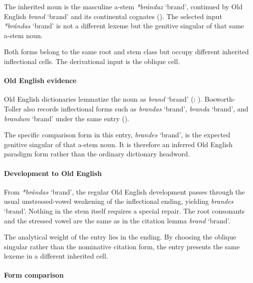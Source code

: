 \documentclass[
  british,
  a4paper,
]{article}
\providecommand{\Recon}[1]{\emph{*#1}}
\begin{document}
The inherited noun is the masculine a-stem \Recon{brándaz} `brand',
continued by Old English {\emph{brand}} `brand' and its continental
cognates (). The selected input
\Recon{brándas} `brand' is not a different lexeme but the genitive
singular of that same a-stem noun.

Both forms belong to the same root and stem class but occupy different
inherited inflectional cells. The derivational input is the oblique
cell.

\paragraph{Old English evidence}\label{old-english-evidence-93}

Old English dictionaries lemmatize the noun as {\emph{brand}} `brand'
(;
).
Bosworth-Toller also records inflectional forms such as {\emph{brandas}}
`brand', {\emph{branda}} `brand', and {\emph{brandum}} `brand' under the
same entry ().

The specific comparison form in this entry, {\emph{brandes}} `brand', is
the expected genitive singular of that a-stem noun. It is therefore an
inferred Old English paradigm form rather than the ordinary dictionary
headword.

\paragraph{Development to Old
English}\label{development-to-old-english-91}

From \Recon{brándas} `brand', the regular Old English development passes
through the usual unstressed-vowel weakening of the inflectional ending,
yielding {\emph{brandes}} `brand'. Nothing in the stem itself requires a
special repair. The root consonants and the stressed vowel are the same
as in the citation lemma {\emph{brand}} `brand'.

The analytical weight of the entry lies in the ending. By choosing the
oblique singular rather than the nominative citation form, the entry
presents the same lexeme in a different inherited cell.

\paragraph{Form comparison}\label{form-comparison-3}
\end{document}
